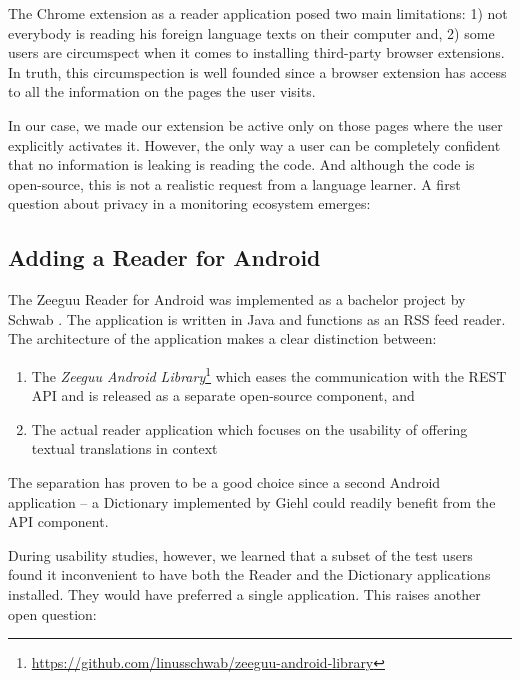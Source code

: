 The Chrome extension as a reader application posed two main limitations: 
	1) not everybody is reading his foreign language texts on their computer and,
	2) some users are circumspect when it comes to installing third-party browser extensions. 
In truth, this circumspection is well founded since a browser extension has access to all the information on the pages the user visits. 

In our case, we made our extension be active only on those pages where the user explicitly activates it. However, the only way a user can be completely confident that no information is leaking is reading the code. And although the code is open-source, this is not a realistic request from a language learner. A first question about privacy in a monitoring ecosystem emerges: 



\subsection {Adding a Reader for Android}

The Zeeguu Reader for Android was implemented as a bachelor project by Schwab \cite{Schw16thesis}. The application is written in Java and functions as an RSS feed reader. The architecture of the application makes a clear distinction between: 

\begin{enumerate}
	\item The {\em Zeeguu Android Library}\footnote{\url{https://github.com/linusschwab/zeeguu-android-library}} which eases the communication with the REST API and is released as a separate open-source component, and 
	\item The actual reader application which focuses on the usability of offering textual translations in context
\end{enumerate}

The separation has proven to be a good choice since a second Android application -- a Dictionary implemented by Giehl \cite{Gieh15a} could readily benefit from the API component.

During usability studies, however, we learned that a subset of the test users found it inconvenient to have both the Reader and the Dictionary applications installed. They would have preferred a single application. This raises another open question:


